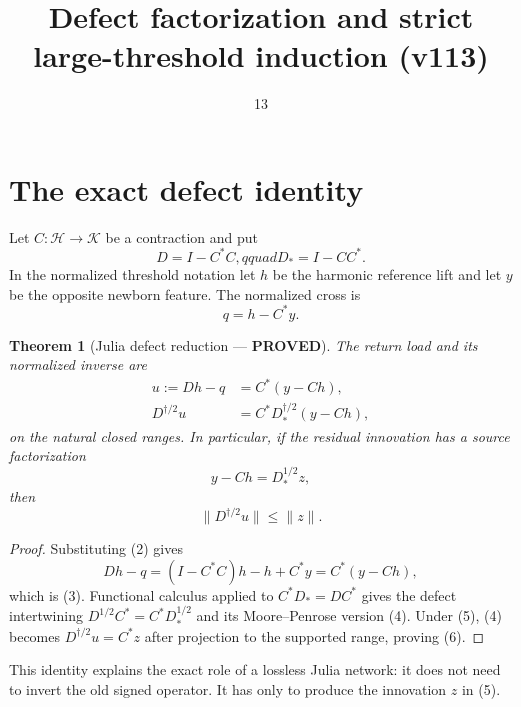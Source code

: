 \documentclass[11pt]{article}
\title{Defect factorization and strict large-threshold induction (v113)}
\date{13}
\newcommand{\PROVED}{\textcolor{green!40!black}{\textbf{PROVED}}}
\newtheorem{theorem}{Theorem}
\begin{document}
\maketitle

\section{The exact defect identity}

Let $C:\mathscr H\to\mathscr K$ be a contraction and put
\begin{equation}
 D=I-C^*C,qquad D_*=I-CC^*.                                  \tag{1}
\end{equation}
In the normalized threshold notation let $h$ be the harmonic reference
lift and let $y$ be the opposite newborn feature.  The normalized cross is
\begin{equation}
 q=h-C^*y.                                                     \tag{2}
\end{equation}

\begin{theorem}[Julia defect reduction --- \PROVED]
The return load and its normalized inverse are
\begin{align}
 u:=Dh-q&=C^*(y-Ch),                                          \tag{3}\\
 D^{\dagger/2}u&=C^*D_*^{\dagger/2}(y-Ch),                    \tag{4}
\end{align}
on the natural closed ranges.  In particular, if the residual innovation
has a source factorization
\begin{equation}
                         y-Ch=D_*^{1/2}z,                      \tag{5}
\end{equation}
then
\begin{equation}
                         \|D^{\dagger/2}u\|\le\|z\|.          \tag{6}
\end{equation}
\end{theorem}

\begin{proof}
Substituting (2) gives
\[
 Dh-q=(I-C^*C)h-h+C^*y=C^*(y-Ch),
\]
which is (3).  Functional calculus applied to
$C^*D_*=DC^*$ gives the defect intertwining
$D^{1/2}C^*=C^*D_*^{1/2}$ and its Moore--Penrose version (4).  Under (5),
(4) becomes $D^{\dagger/2}u=C^*z$ after projection to the supported
range, proving (6).
\end{proof}

This identity explains the exact role of a lossless Julia network: it does
not need to invert the old signed operator.  It has only to produce the
innovation $z$ in (5).
\end{document}
